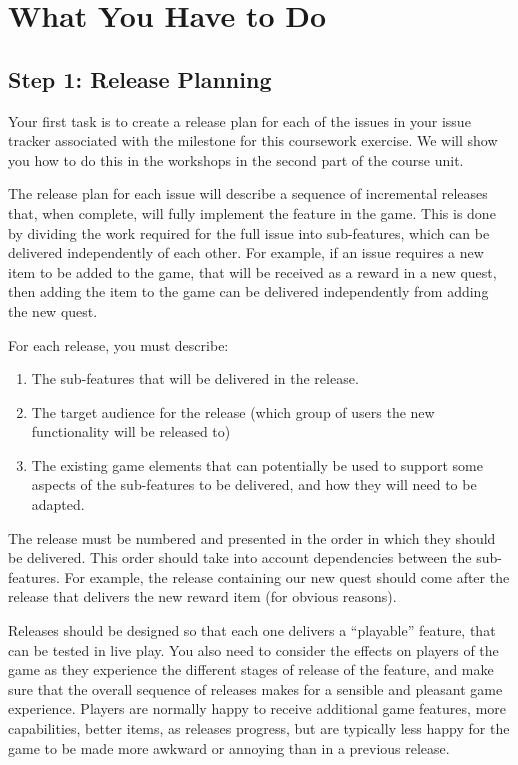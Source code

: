 \documentclass[
]{book}
\providecommand{\tightlist}{%
  \setlength{\itemsep}{0pt}\setlength{\parskip}{0pt}}
\begin{document}
\hypertarget{udo}{%
\section{What You Have to Do}\label{udo}}

\hypertarget{releaseplan}{%
\subsection{Step 1: Release Planning}\label{releaseplan}}

Your first task is to create a release plan for each of the issues in your issue tracker associated with the milestone for this coursework exercise. We will show you how to do this in the workshops in the second part of the course unit.

The release plan for each issue will describe a sequence of incremental releases that, when complete, will fully implement the feature in the game. This is done by dividing the work required for the full issue into sub-features, which can be delivered independently of each other. For example, if an issue requires a new item to be added to the game, that will be received as a reward in a new quest, then adding the item to the game can be delivered independently from adding the new quest.

For each release, you must describe:

\begin{enumerate}
\def\labelenumi{\arabic{enumi}.}
\tightlist
\item
  The sub-features that will be delivered in the release.
\item
  The target audience for the release (which group of users the new functionality will be released to)
\item
  The existing game elements that can potentially be used to support some aspects of the sub-features to be delivered, and how they will need to be adapted.
\end{enumerate}

The release must be numbered and presented in the order in which they should be delivered. This order should take into account dependencies between the sub-features. For example, the release containing our new quest should come after the release that delivers the new reward item (for obvious reasons).

Releases should be designed so that each one delivers a ``playable'' feature, that can be tested in live play. You also need to consider the effects on players of the game as they experience the different stages of release of the feature, and make sure that the overall sequence of releases makes for a sensible and pleasant game experience. Players are normally happy to receive additional game features, more capabilities, better items, as releases progress, but are typically less happy for the game to be made more awkward or annoying than in a previous release.
\end{document}
